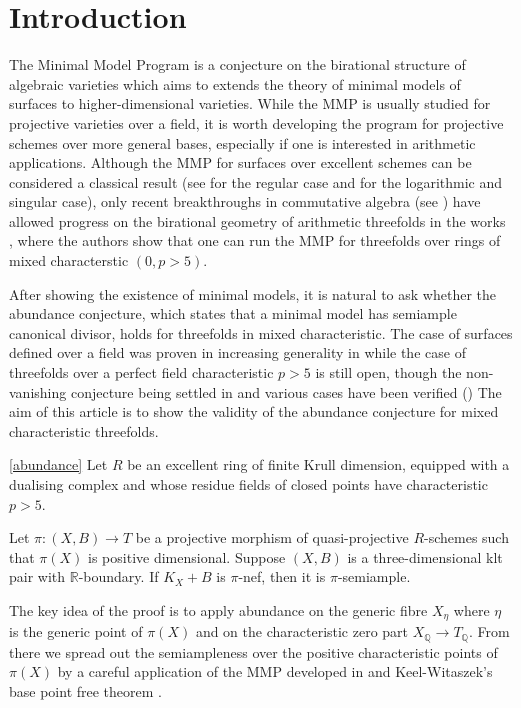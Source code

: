 \documentclass[a4paper,12pt]{book}
\begin{document}
	\section{Introduction}
	
	The Minimal Model Program is a conjecture on the birational structure of algebraic varieties which aims to extends the theory of minimal models of surfaces to higher-dimensional varieties.
	While the MMP is usually studied for projective varieties over a field, it is worth developing the program for projective schemes over more general bases, especially if one is interested in arithmetic applications. 
	Although the MMP for surfaces over excellent schemes can be considered a classical result (see \cite{Sha66} for the regular case and \cite{Tan18} for the logarithmic and singular case), only recent breakthroughs in commutative algebra (see \cite{bhatt2020cohenmacaulayness}) have allowed progress on the birational geometry of arithmetic threefolds in the works \cite{takamatsu2021minimal,bhatt2020}, where the authors show that one can run the MMP for threefolds over rings of mixed characterstic $(0, p>5)$. 
	
	After showing the existence of minimal models, it is natural to ask whether the abundance conjecture, which states that a minimal model has semiample canonical divisor, holds for threefolds in mixed characteristic. 
	The case of surfaces defined over a field was proven in increasing generality in \cite{fujino2012log, Tan14, tanaka2020abundance} while the case of threefolds over a perfect field characteristic $p>5$ is still open, though the non-vanishing conjecture being settled in \cite{XZ19, Wit} and various cases have been verified (\cite{DW19, Zha20})
	The aim of this article is to show the validity of the abundance conjecture for mixed characteristic threefolds.
	
	\begin{theorem}\label{Main_Abund1}\autoref{abundance}
		Let $R$ be an excellent ring of finite Krull dimension, equipped with a dualising complex and whose residue fields of closed points have characteristic $p>5$.
		
		Let $\pi \colon (X,B) \to T$ be a projective morphism of quasi-projective $R$-schemes such that $\pi(X)$ is positive dimensional.
		Suppose $(X,B)$ is a three-dimensional klt pair with $\mathbb{R}$-boundary. If $K_X+B$ is $\pi$-nef, then it is $\pi$-semiample.
	\end{theorem}
	
	The key idea of the proof is to apply abundance on the generic fibre $X_\eta$ where $\eta$ is the generic point of $\pi(X)$ and on the characteristic zero part $X_{\mathbb{Q}} \to T_{\mathbb{Q}}$. From there we spread out the semiampleness over the positive characteristic points of $\pi(X)$ by a careful application of the MMP developed in \cite{bhatt2020} and Keel-Witaszek's base point free theorem \cite{witaszek2020keels}. 
	
\end{document}
